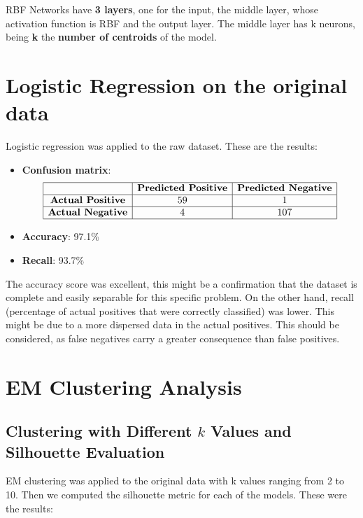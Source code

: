 \documentclass[a4paper,12pt]{article}
\begin{document}
RBF Networks have \textbf{3 layers}, one for the input, the middle layer, whose activation function is RBF and the output layer. The middle layer has k neurons, being \textbf{k} the \textbf{number of centroids} of the model. 

\section{Logistic Regression on the original data}
\label{sec:logistic-regression-original}
Logistic regression was applied to the raw dataset. These are the results:
\begin{itemize}
    \item \textbf{Confusion matrix}: 
    \[
    \begin{array}{|c|c|c|}
    \hline
    & \textbf{Predicted Positive} & \textbf{Predicted Negative} \\
    \hline
    \textbf{Actual Positive} & 59 & 1 \\
    \hline
    \textbf{Actual Negative} & 4 & 107 \\
    \hline
    \end{array}
    \]
    \item \textbf{Accuracy}: 97.1\%
    \item \textbf{Recall}: 93.7\%

    
\end{itemize}

The accuracy score was excellent, this might be a confirmation that the dataset is complete and easily separable for this specific problem. On the other hand, recall (percentage of actual positives that were correctly classified) was lower. This might be due to a more dispersed data in the actual positives. This should be considered, as false negatives carry a greater consequence than false positives.

\section{EM Clustering Analysis}
\label{sec:em-clustering}

\subsection{Clustering with Different \(k\) Values and Silhouette Evaluation}
EM clustering was applied to the original data with k values ranging from 2 to 10. Then we computed the silhouette metric for each of the models. These were the results:
\end{document}
